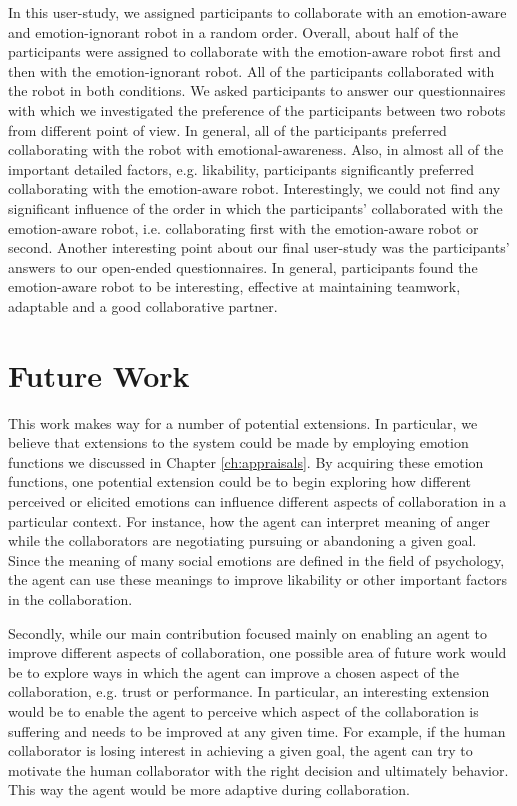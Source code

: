 \documentclass[12pt]{report}
\begin{document}
In this user-study, we assigned participants to collaborate with an
emotion-aware and emotion-ignorant robot in a random order. Overall, about half
of the participants were assigned to collaborate with the emotion-aware robot
first and then with the emotion-ignorant robot. All of the participants
collaborated with the robot in both conditions. We asked participants to answer
our questionnaires with which we investigated the preference of the participants
between two robots from different point of view. In general, all of the
participants preferred collaborating with the robot with emotional-awareness.
Also, in almost all of the important detailed factors, e.g. likability,
participants significantly preferred collaborating with the emotion-aware robot.
Interestingly, we could not find any significant influence of the order in which
the participants' collaborated with the emotion-aware robot, i.e.
collaborating first with the emotion-aware robot or second. Another interesting
point about our final user-study was the participants' answers to our open-ended
questionnaires. In general, participants found the emotion-aware robot to be
interesting, effective at maintaining teamwork, adaptable and a good
collaborative partner.

\section{Future Work}

This work makes way for a number of potential extensions. In particular, we
believe that extensions to the system could be made by employing emotion
functions we discussed in Chapter \ref{ch:appraisals}. By acquiring these
emotion functions, one potential extension could be to begin exploring how
different perceived or elicited emotions can influence different aspects of
collaboration in a particular context. For instance, how the agent can interpret
meaning of anger while the collaborators are negotiating pursuing or abandoning
a given goal. Since the meaning of many social emotions are defined in the field
of psychology, the agent can use these meanings to improve likability or other
important factors in the collaboration.

Secondly, while our main contribution focused mainly on enabling an agent to
improve different aspects of collaboration, one possible area of future work
would be to explore ways in which the agent can improve a chosen aspect of the
collaboration, e.g. trust or performance. In particular, an interesting
extension would be to enable the agent to perceive which aspect of the
collaboration is suffering and needs to be improved at any given time. For
example, if the human collaborator is losing interest in achieving a given
goal, the agent can try to motivate the human collaborator with the right
decision and ultimately behavior. This way the agent would be more adaptive
during collaboration.
\end{document}
